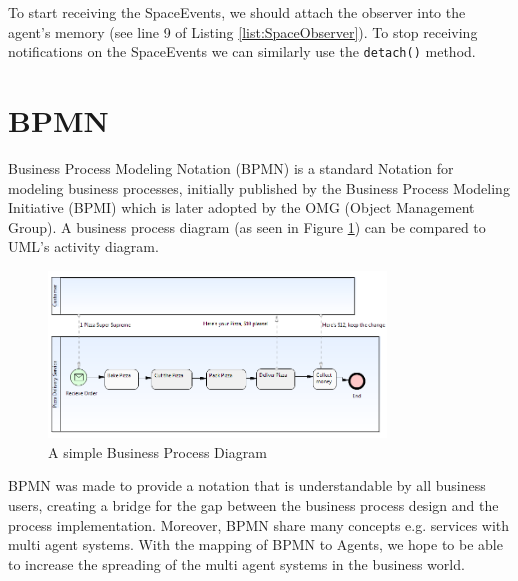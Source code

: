 To start receiving the SpaceEvents, we should attach the observer into the agent's memory (see line 9 of Listing \ref{list:SpaceObserver}). To stop receiving notifications on the SpaceEvents we can similarly use the \texttt{detach()} method.

\section{BPMN}
Business Process Modeling Notation (BPMN) \cite{BPMN2} is a standard Notation for modeling business processes, initially published by the Business Process Modeling Initiative (BPMI) which is later adopted by the OMG (Object Management Group). A business process diagram (as seen in Figure \ref{fig:bpmn_sampl}) can be compared to UML's activity diagram.\\
\begin{figure}[h]
	\centering
		\includegraphics[width=0.80\textwidth]{images/bpmn_sampl.png}
	\caption{A simple Business Process Diagram}
	\label{fig:bpmn_sampl}
\end{figure}

BPMN was made to provide a notation that is understandable by all business users, creating a bridge for the gap between the business process design and the process implementation. Moreover, BPMN share many concepts e.g. services with multi agent systems. With the mapping of BPMN to Agents, we hope to be able to increase the spreading of the multi agent systems in the business world.


